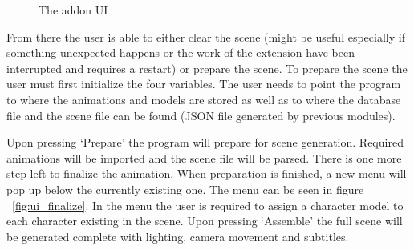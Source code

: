 \begin{figure}[H]
\centerline{}
\caption{The addon UI}\label{fig:ui_main}
\end{figure}

From there the user is able to either clear the scene (might be useful especially if something unexpected happens or the work of the extension have been interrupted and requires a restart) or prepare the scene. To prepare the scene the user must first initialize the four variables. The user needs to point the program to where the animations and models are stored as well as to where the database file and the scene file can be found (JSON file generated by previous modules).

Upon pressing `Prepare' the program will prepare for scene generation. Required animations will be imported and the scene file will be parsed. There is one more step left to finalize the animation. When preparation is finished, a new menu will pop up below the currently existing one. The menu can be seen in figure ~\ref{fig:ui_finalize}. In the menu the user is required to assign a character model to each character existing in the scene. Upon pressing `Assemble' the full scene will be generated complete with lighting, camera movement and subtitles.

